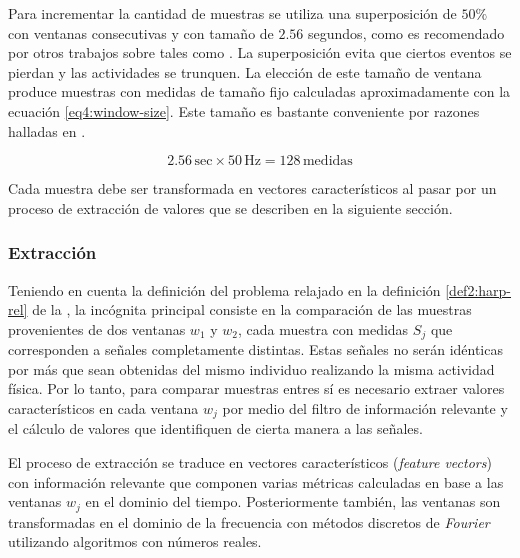 Para incrementar la cantidad de muestras se utiliza una superposición
de $50\%$ con ventanas consecutivas y con tamaño de $2.56$ segundos,
como es recomendado por otros trabajos sobre  tales como
\cite{Bao2004,ReyesOrtiz2015}. La superposición evita que ciertos
eventos se pierdan y las actividades se trunquen. La elección de este
tamaño de ventana produce muestras con medidas de tamaño fijo calculadas
aproximadamente con la ecuación \ref{eq4:window-size}. Este tamaño
es bastante conveniente por razones halladas en \cite{ReyesOrtiz2015}.

\begin{equation}
2.56\,\mathrm{sec}\times50\mathrm{\,Hz}=128\,\mathrm{medidas}\label{eq4:window-size}
\end{equation}

Cada muestra debe ser transformada en vectores característicos al
pasar por un proceso de extracción de valores que se describen en
la siguiente sección.

\subsubsection{Extracción}

\label{ssec44:extraction}Teniendo en cuenta la definición del problema
relajado en la definición \ref{def2:harp-rel} de la ,
la incógnita principal consiste en la comparación de las muestras
provenientes de dos ventanas $w_{1}$ y $w_{2}$, cada muestra con
medidas $S_{j}$ que corresponden a señales completamente distintas.
Estas señales no serán idénticas por más que sean obtenidas del mismo
individuo realizando la misma actividad física. Por lo tanto, para
comparar muestras entres sí es necesario extraer valores característicos
en cada ventana $w_{j}$ por medio del filtro de información relevante
y el cálculo de valores que identifiquen de cierta manera a las señales. 

El proceso de extracción se traduce en vectores característicos (\emph{feature
vectors}) con información relevante que componen varias métricas calculadas
en base a las ventanas $w_{j}$ en el dominio del tiempo. Posteriormente
también, las ventanas son transformadas en el dominio de la frecuencia
con métodos discretos de\emph{ Fourier} utilizando algoritmos 
con números reales. 

